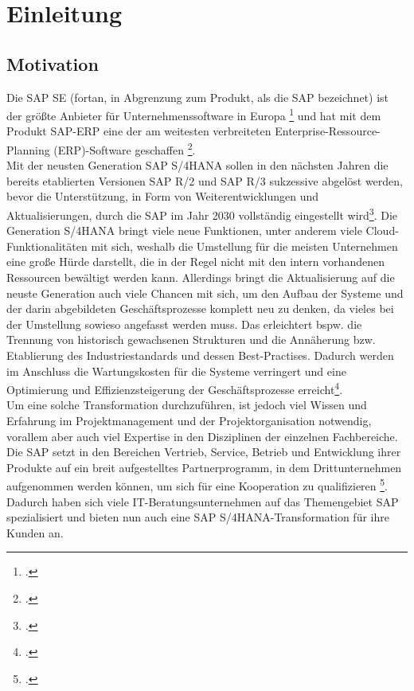 \section{Einleitung}
\subsection{Motivation}
Die SAP SE (fortan, in Abgrenzung zum Produkt, als \glqq{}die\grqq{} SAP bezeichnet) ist der größte Anbieter für Unternehmenssoftware in Europa \footcite{sap-about} und hat mit dem Produkt SAP-ERP eine der am weitesten verbreiteten Enterprise-Ressource-Planning (ERP)-Software geschaffen \footcite{}. \\Mit der neusten Generation SAP S/4HANA sollen in den nächsten Jahren die bereits etablierten Versionen SAP R/2 und SAP R/3 sukzessive abgelöst werden, bevor die Unterstützung, in Form von Weiterentwicklungen und Aktualisierungen, durch die SAP im Jahr 2030 vollständig eingestellt wird\footcite{sap-support}. Die Generation S/4HANA bringt viele neue Funktionen, unter anderem viele Cloud-Funktionalitäten mit sich, weshalb die Umstellung für die meisten Unternehmen eine große Hürde darstellt, die in der Regel nicht mit den intern vorhandenen Ressourcen bewältigt werden kann. Allerdings bringt die Aktualisierung auf die neuste Generation auch viele Chancen mit sich, um den Aufbau der Systeme und der darin abgebildeten Geschäftsprozesse komplett neu zu denken, 
da vieles bei der Umstellung sowieso angefasst werden muss. Das erleichtert bspw. die Trennung von historisch gewachsenen Strukturen und die Annäherung bzw. Etablierung des Industriestandards und dessen Best-Practises. Dadurch werden im Anschluss die Wartungskosten für die Systeme verringert und eine Optimierung und Effizienzsteigerung der Geschäftsprozesse erreicht\footcite{}.\\ Um eine solche Transformation durchzuführen, ist jedoch viel Wissen und Erfahrung im Projektmanagement und der Projektorganisation notwendig, vorallem aber auch viel Expertise in den Disziplinen der einzelnen Fachbereiche.
Die SAP setzt in den Bereichen Vertrieb, Service, Betrieb und  Entwicklung ihrer Produkte auf ein breit aufgestelltes Partnerprogramm, in dem Drittunternehmen aufgenommen werden können, um sich für eine Kooperation zu qualifizieren \footcite{sap-partner}. Dadurch haben sich viele IT-Beratungsunternehmen auf das Themengebiet SAP spezialisiert und bieten nun auch eine SAP S/4HANA-Transformation für ihre Kunden an.

